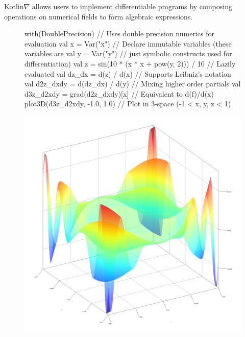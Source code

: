 \documentclass[12pt,initial,twoside,maitrise]{dms}
\numberwithin{equation}{section}
\numberwithin{table}{chapter}
\numberwithin{figure}{chapter}
\begin{document}
Kotlin$\nabla$ allows users to implement differentiable programs by composing operations on numerical fields to form algebraic expressions. %
%
\begin{figure}
\begin{unbreakablelisting}[caption={A basic Kotlin$\nabla$ program with two inputs and one output, rendered below.}, basicstyle=\ttfamily\small, language=Kotlin, label={lst:basic_kotlingrad}]
with(DoublePrecision) { // Uses double precision numerics for evaluation
  val x = Var("x") // Declare immutable variables (these variables are
  val y = Var("y") // just symbolic constructs used for differentiation)
  val z = sin(10 * (x * x + pow(y, 2))) / 10 // Lazily evaluated
  val dz_dx = d(z) / d(x) // Supports Leibniz's notation
  val d2z_dxdy = d(dz_dx) / d(y) // Mixing higher order partials
  val d3z_d2xdy = grad(d2z_dxdy)[x] // Equivalent to d(f)/d(x)
  plot3D(d3z_d2xdy, -1.0, 1.0) // Plot in 3-space (-1 < x, y, z < 1)
}
\end{unbreakablelisting}
\includegraphics[scale=0.43]{plot_result.png}
\end{figure}
\end{document}
